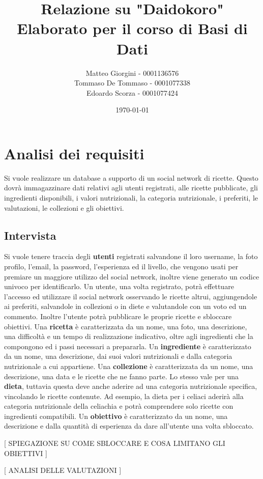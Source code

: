 ﻿\documentclass[a4paper,12pt]{report}
\title{Relazione su "Daidokoro" \\ Elaborato per il corso di Basi di Dati}
\author
{
    Matteo Giorgini - 0001136576 \\
    Tommaso De Tommaso - 0001077338 \\
    Edoardo Scorza - 0001077424 \\
}
\date{\today}
\begin{document}
\maketitle
\tableofcontents

\chapter{Analisi dei requisiti}
Si vuole realizzare un database a supporto di un social network di ricette.
Questo dovrà immagazzinare dati relativi agli utenti registrati, alle ricette pubblicate, gli ingredienti disponibili, i valori nutrizionali, la categoria nutrizionale, i preferiti, le valutazioni, le collezioni e gli obiettivi.

\section{Intervista}
Si vuole tenere traccia degli \textbf{utenti} registrati salvandone il loro username, la foto profilo, l'email, la password, l'esperienza ed il livello, che vengono usati per premiare un maggiore utilizzo del social network, inoltre viene generato un codice univoco per identificarlo. Un utente, una volta registrato, potrà effettuare l'accesso ed utilizzare il social network osservando le ricette altrui, aggiungendole ai preferiti, salvandole in collezioni o in diete e valutandole con un voto ed un commento. Inoltre l'utente potrà pubblicare le proprie ricette e sbloccare obiettivi.
Una \textbf{ricetta} è caratterizzata da un nome, una foto, una descrizione, una difficoltà e un tempo di realizzazione indicativo, oltre agli ingredienti che la compongono ed i passi necessari a prepararla.
Un \textbf{ingrediente} è caratterizzato da un nome, una descrizione, dai suoi valori nutrizionali e dalla categoria nutrizionale a cui appartiene.
Una \textbf{collezione} è caratterizzata da un nome, una descrizione, una data e le ricette che ne fanno parte. Lo stesso vale per una \textbf{dieta}, tuttavia questa deve anche aderire ad una categoria nutrizionale specifica, vincolando le ricette contenute. Ad esempio, la dieta per i celiaci aderirà alla categoria nutrizionale della celiachia e potrà comprendere solo ricette con ingredienti compatibili.
Un \textbf{obiettivo} è caratterizzato da un nome, una descrizione e dalla quantità di esperienza da dare all'utente una volta sbloccato.

[ SPIEGAZIONE SU COME SBLOCCARE E COSA LIMITANO GLI OBIETTIVI ]

[ ANALISI DELLE VALUTAZIONI ]
\end{document}

